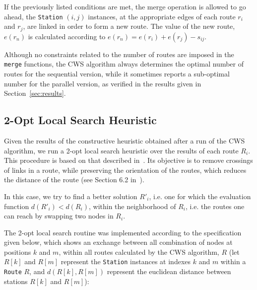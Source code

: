 If the previously listed conditions are met, the merge operation is allowed to 
go ahead, the \verb?Station? $(i,j)$ instances, at the appropriate edges of each 
route $r_i$ and $r_j$, are linked in order to form a new route. The value of the 
new route, $e(r_n)$ is calculated according to 
$e(r_n) = e(r_i) + e(r_j) - s_{ij}$.\vertbreak

Although no constraints related to the number 
of routes are imposed in the \verb?merge? functions, the CWS algorithm always 
determines the optimal number of routes for the sequential version, while it 
sometimes reports a sub-optimal number for the parallel 
version, as verified in the results given in Section~\ref{sec:results}.

\subsection{2-Opt Local Search Heuristic}
\label{subsec:2-opt}

Given the results of the constructive heuristic obtained after a run of the CWS 
algorithm, we run a 2-opt local search heuristic over the results of each route 
$R_i$. This procedure is based on that described in~\cite{Psaraftis1983391, 
Thangiahl1996}. Its objective is to remove crossings of links in a route, while 
preserving the orientation of the routes, which reduces the distance of the 
route (see Section 6.2 in~\cite{Michalewicz2004}).\vertbreak

In this case, we try to find a better solution $R'_i$, i.e. one for which the 
evaluation function $d(R'_i) < d(R_i)$, within the neighborhood of $R_i$, i.e. 
the routes one can reach by swapping two nodes in $R_i$.\vertbreak

The 2-opt local search routine was implemented according to the specification 
given below, which shows an exchange between all combination of nodes at 
positions $k$ and $m$, within all routes calculated by the CWS algorithm, 
$R$ (let $R[k]$ and $R[m]$ represent the \verb+Station+ instances at indexes 
$k$ and $m$ within a \verb+Route+ $R$, and $d(R[k], R[m])$ represent the 
euclidean distance between stations $R[k]$ and $R[m]$):\vertbreak

